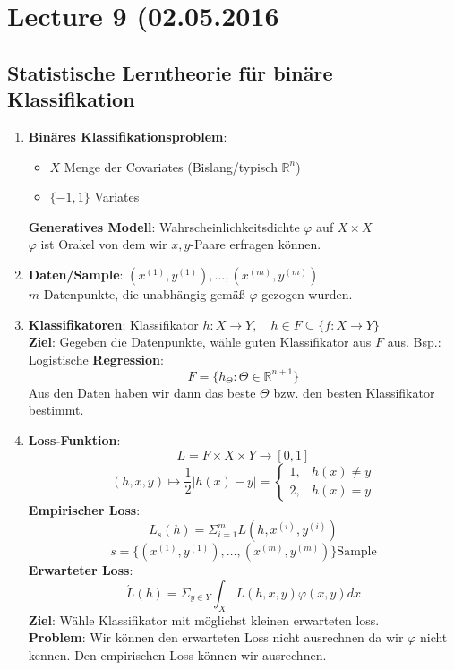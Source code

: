 \section*{Lecture 9 (02.05.2016}
\subsection*{Statistische Lerntheorie für binäre Klassifikation}

\begin{enumerate}[1.]

\item \textbf{Binäres Klassifikationsproblem}:

\begin{itemize}
\item $X$ Menge der Covariates (Bislang/typisch $\mathbb{R}^n$)
\item $\{-1,1\}$ Variates
\end{itemize}

\textbf{Generatives Modell}: Wahrscheinlichkeitsdichte $\varphi$ auf $X \times X$\\
$\varphi$ ist Orakel von dem wir $x, y$-Paare erfragen können.

\item \textbf{Daten/Sample}: $(x^{(1)},y^{(1)}) , \dots ,(x^{(m)}, y^{(m)})$\\
$m$-Datenpunkte, die unabhängig gemäß $\varphi$ gezogen wurden.

\item \textbf{Klassifikatoren}: Klassifikator $h: X \rightarrow Y, \quad h\in F \subseteq \{f: X \rightarrow Y\}$\\
\textbf{Ziel}: Gegeben die Datenpunkte, wähle guten Klassifikator aus $F$ aus. Bsp.: Logistische \textbf{Regression}:
\[F = \{h_\Theta: \Theta \in \mathbb{R}^{n+1}\}\]
Aus den Daten haben wir dann das beste $\Theta$ bzw. den besten Klassifikator bestimmt.
\item \textbf{Loss-Funktion}: 
\[L = F \times X \times Y \rightarrow [0,1]\]
\[(h,x,y) \mapsto \frac{1}{2} |h(x)-y| = \begin{cases}1,& h(x) \neq y \\2,& h(x) = y\end{cases}\]
\textbf{Empirischer Loss}:
\[L_s(h) = \Sigma_{i=1}^m L(h,x^{(i)},y^{(i)})\]
\[s = \{(x^{(1)}, y^{(1)}) , \dots ,(x^{(m)}, y^{(m)})\} \text{Sample}\]
\textbf{Erwarteter Loss}:
\[\acute{L}(h) = \Sigma_{y \in Y} \int_X L(h,x,y) \varphi(x,y) dx\]
\textbf{Ziel}: Wähle Klassifikator mit möglichst kleinen erwarteten loss.\\
\textbf{Problem}: Wir können den erwarteten Loss nicht ausrechnen da wir $\varphi$ nicht kennen. Den empirischen Loss können wir ausrechnen.


\end{enumerate}
